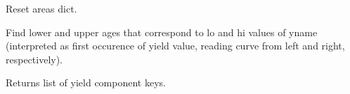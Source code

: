 \documentclass[letterpaper,10pt,english]{sphinxmanual}
\begin{document}
\begin{fulllineitems}
\begin{fulllineitems}
\end{fulllineitems}


\begin{fulllineitems}
\label{\detokenize{forest:forest.DevelopmentType.reset_areas}}
Reset areas dict.

\end{fulllineitems}


\begin{fulllineitems}
\label{\detokenize{forest:forest.DevelopmentType.resolve_condition}}
Find lower and upper ages that correspond to lo and hi values of yname (interpreted as first occurence of yield value, reading curve from left and right, respectively).

\end{fulllineitems}


\begin{fulllineitems}
\label{\detokenize{forest:forest.DevelopmentType.ycomp}}
\end{fulllineitems}


\begin{fulllineitems}
\label{\detokenize{forest:forest.DevelopmentType.ycomps}}
Returns list of yield component keys.

\end{fulllineitems}


\end{fulllineitems}

\end{document}
